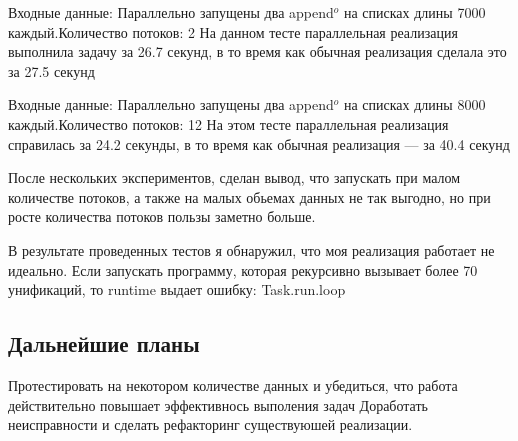 Входные данные: Параллельно запущены два append$^o$ на списках длины 7000 каждый.Количество потоков: 2 
На данном тесте параллельная реализация выполнила задачу за 26.7 секунд, в то время как обычная реализация сделала это за 27.5 секунд

Входные данные: Параллельно запущены два append$^o$ на списках длины 8000 каждый.Количество потоков: 12
На этом тесте параллельная реализация справилась за 24.2 секунды, в то время как обычная реализация --- за 40.4 секунд

После нескольких экспериментов, сделан вывод, что запускать при малом количестве потоков, а также на малых обьемах данных не так выгодно, но при росте количества потоков пользы заметно больше.

В результате проведенных тестов я обнаружил, что моя реализация работает не идеально. Если запускать программу, которая рекурсивно вызывает более 70 унификаций, то runtime выдает ошибку: Task.run.loop

\subsection{ \textbf{Дальнейшие планы}}

Протестировать на некотором количестве данных и убедиться, что
работа действительно повышает эффективнось выполения задач 
Доработать неисправности и сделать рефакторинг
существуюшей реализации.


